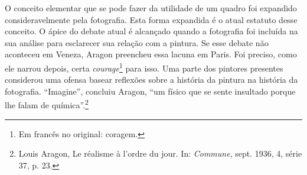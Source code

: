 O conceito elementar que se pode fazer da utilidade de um quadro foi
expandido consideravelmente pela fotografia. Esta forma expandida é o
atual estatuto desse conceito. O ápice do debate atual é alcançado quando a
fotografia foi incluída na sua análise para esclarecer sua relação com a pintura. Se esse debate não aconteceu em Veneza, Aragon preencheu essa lacuna em Paris. Foi
preciso, como ele narrou depois, certa \emph{courage}\footnote{Em
  francês no original: coragem. \versal{[N. T.]}} para isso. Uma parte dos
pintores presentes
considerou uma ofensa basear reflexões sobre a história da pintura na
história da fotografia. ``Imagine'', concluiu Aragon, ``um físico que se
sente insultado porque lhe falam de química''.\footnote{Louis Aragon, Le
  réalisme à l'ordre du jour. In: \emph{Commune}, sept. 1936, 4, série
  37, p. 23.}

